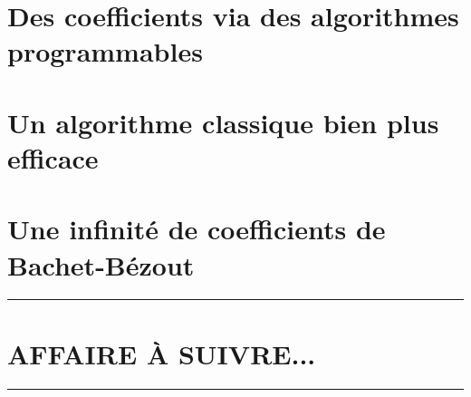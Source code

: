 \documentclass[12pt]{amsart}
\newcommand\bb{Bachet-Bézout}
\begin{document}
\newpage
\section{Des coefficients via des algorithmes programmables}






\newpage
\section{Un algorithme classique bien plus efficace}






\newpage
\section{Une infinité de coefficients de \bb}












%







\bigskip

\hrule

\section{AFFAIRE À SUIVRE...}

\bigskip

\hrule
\end{document}
